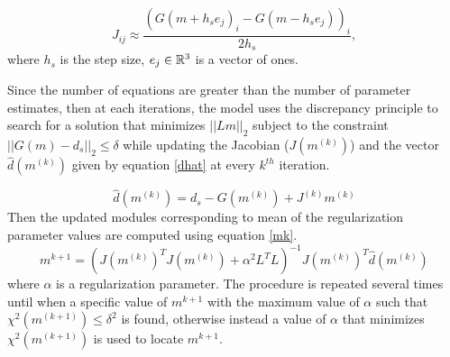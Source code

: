 \documentclass[12pt,a4paper]{article}
\begin{document}
\begin{itemize}
	\begin{equation}
		J_{ij}  \approx \frac{(G(m + h_{s} e_j)_i - G(m -  h_{s}e_j) )_i}{2h_{s}},
		\label{jac}
	\end{equation}
	where $h_s$ is  the step size, $e_j \in \mathbb{R}^{3\time1}$ is a vector of ones.
	\end{itemize}
	
	Since the number of equations are greater than the number of parameter estimates, then at each iterations, the model uses the discrepancy principle to search for a solution that minimizes $||Lm||_2$ subject to the constraint $||G(m) - d_s||_2 \le \delta $ while updating the Jacobian ($J(m^{(k)})$) and the vector $\hat{d}(m^{(k)})$ given by equation \eqref{dhat} at every $k^{th}$ iteration.
	
	\begin{equation}
		\hat{d}(m^{(k)}) = d_s - G(m^{(k)})+  J^{(k)}m^{(k)}
		\label{dhat}
	\end{equation}
	Then the updated modules corresponding to mean of the regularization parameter values are computed using equation \eqref{mk}.
		\begin{equation}
		m^{k+1} = (J(m^{(k)})^{T}J(m^{(k)}) + \alpha^2L^TL)^{-1}J(m^{(k)})^T\hat{d}(m^{(k)})
		\label{mk}
	\end{equation}
	where $\alpha$ is a regularization parameter. The procedure is repeated several times until when a specific value of $m^{k+1} $ with the maximum value  of $\alpha$ such that $\chi^2(m^{(k+1)})  \le \delta^2$ is found, otherwise instead a value of $\alpha$ that minimizes $\chi^2(m^{(k+1)})$ is used to locate  $m^{k+1} $.
	

	
	
	
	
	
\end{document}
